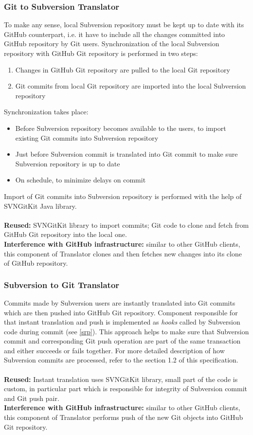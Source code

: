 \subsubsection{Git to Subversion Translator}
To make any sense, local Subversion repository must be kept up to date with its GitHub counterpart, i.e. it have to include all the changes committed into GitHub repository by Git users. Synchronization of the local Subversion repository with GitHub Git repository is performed in two steps:
\begin{enumerate}
\compactlist
\item Changes in GitHub Git repository are pulled to the local Git repository
\item Git commits from local Git repository are imported into the local Subversion repository
\end{enumerate} 
Synchronization takes place:
\begin{itemize}
\item Before Subversion repository becomes available to the users, to import existing Git commits into Subversion repository
\item Just before Subversion commit is translated into Git commit to make sure Subversion repository is up to date
\item On schedule, to minimize delays on commit
\end{itemize} 
Import of Git commits into Subversion repository is performed with the help of SVNGitKit Java library.
\\\\
\textbf{Reused:} SVNGitKit library to import commits; Git code to clone and fetch from GitHub Git repository into the local one.\\
\textbf{Interference with GitHub infrastructure:} similar to other GitHub clients, this component of Translator clones and then fetches new changes into its clone of GitHub repository.

\subsubsection{Subversion to Git Translator}
Commits made by Subversion users are instantly translated into Git commits which are then pushed into GitHub Git repository. Component responsible 
for that instant translation and push is implemented as \emph{hooks} called by Subversion code during commit (see \ref{srp}).
\newpage 
This approach helps to make sure that Subversion commit and corresponding Git push operation are part of the same transaction and either succeeds or fails together.
For more detailed description of how Subversion commits are processed, refer to the section 1.2 of this specification.
\\\\
\textbf{Reused:} Instant translation uses SVNGitKit library, small part of the code is custom, in particular part which is responsible for integrity of Subversion commit and Git push pair.\\
\textbf{Interference with GitHub infrastructure:} similar to other GitHub clients, this component of Translator performs push of the new Git objects into GitHub Git repository.

